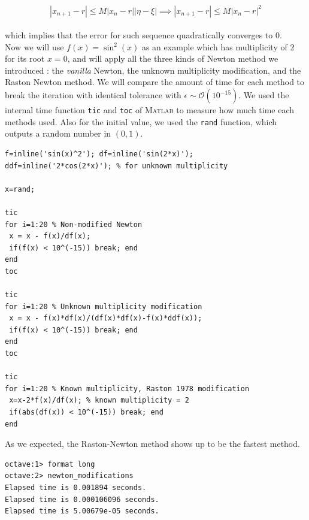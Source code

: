 \documentclass[paper=a4, fontsize=11pt]{scrartcl}
\newcommand{\MATLAB}{\textsc{Matlab}\xspace}
\begin{document}
\begin{equation}\nonumber
	| x_{n+1}-r | \leq M |x_n - r| |\eta - \xi|  \implies | x_{n+1}-r | \leq M |x_n - r|^2
\end{equation}\\

which implies that the error for such sequence quadratically converges to 0.\\

 Now we will use $f(x)=\sin^2(x)$ as an example which has multiplicity of 2 for its root $x=0$, and will apply all the three kinds of Newton method we introduced : the \textit{vanilla} Newton, the unknown multiplicity modification, and the Raston Newton method. We will compare the amount of time for each method to break the iteration with identical tolerance with $\epsilon\sim \mathcal{O}(10^{-15})$. We used the internal time function \texttt{tic} and \texttt{toc} of \MATLAB to measure how much time each methods used. Also for the initial value, we used the \texttt{rand} function, which outputs a random number in $(0,1)$. \\

\begin{lstlisting}[caption='newton\_modifications.m']
f=inline('sin(x)^2'); df=inline('sin(2*x)'); 
ddf=inline('2*cos(2*x)'); % for unknown multiplicity

x=rand;

tic 
for i=1:20 % Non-modified Newton
 x = x - f(x)/df(x);
 if(f(x) < 10^(-15)) break; end
end 
toc

tic 
for i=1:20 % Unknown multiplicity modification
 x = x - f(x)*df(x)/(df(x)*df(x)-f(x)*ddf(x));
 if(f(x) < 10^(-15)) break; end
end 
toc

tic 
for i=1:20 % Known multiplicity, Raston 1978 modification
 x=x-2*f(x)/df(x); % known multiplicity = 2  
 if(abs(df(x)) < 10^(-15)) break; end 
end 

\end{lstlisting}
\vspace{0.15in}

As we expected, the Raston-Newton method shows up to be the fastest method.

\begin{verbatim}
octave:1> format long
octave:2> newton_modifications
Elapsed time is 0.001894 seconds.
Elapsed time is 0.000106096 seconds.
Elapsed time is 5.00679e-05 seconds.
\end{verbatim}
\vspace{0.15in}
\end{document}
